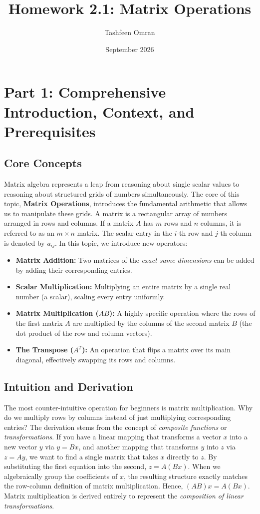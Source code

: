\documentclass{article}
\title{Homework 2.1: Matrix Operations}
\author{Tashfeen Omran}
\date{September 2026}
\begin{document}
\maketitle

\section*{Part 1: Comprehensive Introduction, Context, and Prerequisites}

\subsection*{Core Concepts}
Matrix algebra represents a leap from reasoning about single scalar values to reasoning about structured grids of numbers simultaneously. The core of this topic, \textbf{Matrix Operations}, introduces the fundamental arithmetic that allows us to manipulate these grids. 
A matrix is a rectangular array of numbers arranged in rows and columns. If a matrix $A$ has $m$ rows and $n$ columns, it is referred to as an $m \times n$ matrix. The scalar entry in the $i$-th row and $j$-th column is denoted by $a_{ij}$.
In this topic, we introduce new operators:
\begin{itemize}
    \item \textbf{Matrix Addition:} Two matrices of the \textit{exact same dimensions} can be added by adding their corresponding entries.
    \item \textbf{Scalar Multiplication:} Multiplying an entire matrix by a single real number (a scalar), scaling every entry uniformly.
    \item \textbf{Matrix Multiplication ($AB$):} A highly specific operation where the rows of the first matrix $A$ are multiplied by the columns of the second matrix $B$ (the dot product of the row and column vectors).
    \item \textbf{The Transpose ($A^T$):} An operation that flips a matrix over its main diagonal, effectively swapping its rows and columns.
\end{itemize}

\subsection*{Intuition and Derivation}
The most counter-intuitive operation for beginners is matrix multiplication. Why do we multiply rows by columns instead of just multiplying corresponding entries? 
The derivation stems from the concept of \textit{composite functions} or \textit{transformations}. If you have a linear mapping that transforms a vector $x$ into a new vector $y$ via $y = Bx$, and another mapping that transforms $y$ into $z$ via $z = Ay$, we want to find a single matrix that takes $x$ directly to $z$. By substituting the first equation into the second, $z = A(Bx)$. When we algebraically group the coefficients of $x$, the resulting structure exactly matches the row-column definition of matrix multiplication. Hence, $(AB)x = A(Bx)$. Matrix multiplication is derived entirely to represent the \textit{composition of linear transformations}.
\end{document}
